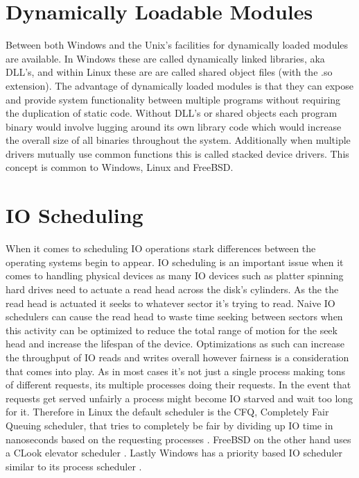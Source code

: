 \documentclass[letterpaper,10pt,draftclsnofoot,onecolumn]{IEEEtran}
\begin{document}
\section{Dynamically Loadable Modules}
Between both Windows and the Unix’s facilities for dynamically loaded modules are available. In Windows these are called dynamically linked libraries, aka DLL’s, and within Linux these are are called shared object files (with the .so extension). The advantage of dynamically loaded modules is that they can expose and provide system functionality between multiple programs without requiring the duplication of static code. Without DLL’s or shared objects each program binary would involve lugging around its own library code which would increase the overall size of all binaries throughout the system. Additionally when multiple drivers mutually use common functions this is called stacked device drivers. This concept is common to Windows, Linux and FreeBSD.\\

\section{IO Scheduling}
When it comes to scheduling IO operations stark differences between the operating systems begin to appear. IO scheduling is an important issue when it comes to handling physical devices as many IO devices such as platter spinning hard drives need to actuate a read head across the disk’s cylinders. As the the read head is actuated it seeks to whatever sector it’s trying to read. Naive IO schedulers can cause the read head to waste time seeking between sectors when this activity can be optimized to reduce the total range of motion for the seek head and increase the lifespan of the device. Optimizations as such can increase the throughput of IO reads and writes overall however fairness is a consideration that comes into play. As in most cases it’s not just a single process making tons of different requests, its multiple processes doing their requests. In the event that requests get served unfairly a process might become IO starved and wait too long for it. Therefore in Linux the default scheduler is the CFQ, Completely Fair Queuing scheduler, that tries to completely be fair by dividing up IO time in nanoseconds based on the requesting processes \cite{love}. FreeBSD on the other hand uses a CLook elevator scheduler \cite{mccusick}. Lastly Windows has a priority based IO scheduler similar to its process scheduler \cite{russinovich}.\\
\end{document}
